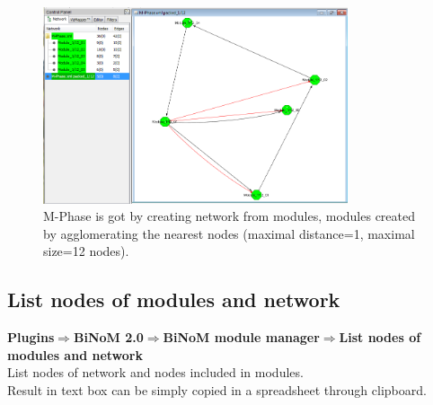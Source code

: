\begin{figure}
\centering
\includegraphics[width=0.8\textwidth]{graphics/M-Phase_packed}
\caption{M-Phase is got by creating network from modules, modules created by agglomerating the nearest nodes (maximal distance=1, maximal size=12 nodes).}
\label{M-Phase_packed}
\end{figure}

\subsection{List nodes of modules and network}
\textbf{Plugins$\Rightarrow$BiNoM 2.0$\Rightarrow$BiNoM module manager$\Rightarrow$List nodes of modules and network}\\
List nodes of network and nodes included in modules.\\
Result in text box can be simply copied in a spreadsheet through clipboard.

